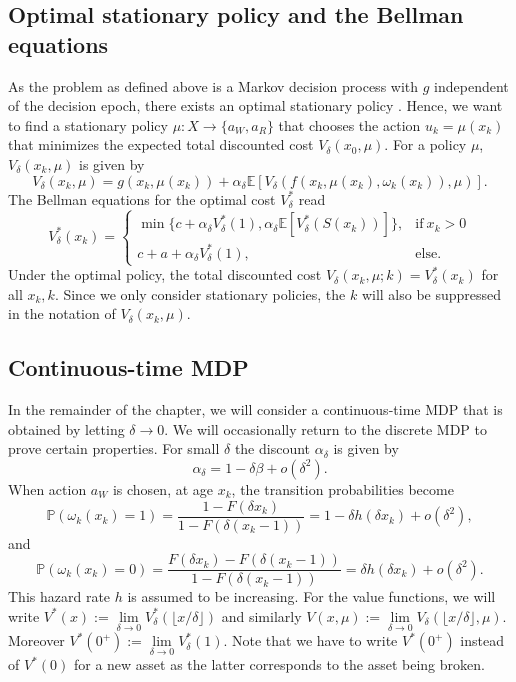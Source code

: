 \documentclass[a4paper]{thesis}
\theoremstyle{definition}
\begin{document}
\subsection{Optimal stationary policy and the Bellman equations}
As the problem as defined above is a Markov decision process with $g$ independent of the decision epoch, there exists an optimal stationary policy \cite{Puterman2008}.
Hence, we want to find a stationary policy $\mu:X\rightarrow \{a_W,a_R\}$ that chooses the action $u_k=\mu(x_k)$ that minimizes the expected total discounted cost $V_\delta(x_0,\mu)$.
For a policy $\mu$, $V_\delta(x_k,\mu)$ is given by
$$
V_\delta(x_k,\mu)=g(x_k,\mu(x_k))+\alpha_\delta \mathbb{E}[V_\delta(f(x_k,\mu(x_k),\omega_k(x_k)),\mu)].
$$
The Bellman equations for the optimal cost $V^*_\delta$ read
\begin{equation}\label{eq:AgeBasedBellman}
V^*_\delta(x_k)=\begin{cases}
\min\{c+\alpha_\delta V^*_\delta(1),\alpha_\delta \mathbb{E}[V^*_\delta(S(x_k))]\},&\text{if}\ x_k>0 \\
c+a+\alpha_\delta V^*_\delta(1),&\text{else.}
\end{cases}
\end{equation}
Under the optimal policy, the total discounted cost $V_\delta(x_k,\mu;k)=V^*_\delta(x_k)$ for all $x_k,k$.
Since we only consider stationary policies, the $k$ will also be suppressed in the notation of $V_\delta(x_k,\mu)$.

\subsection{Continuous-time MDP}
In the remainder of the chapter, we will consider a continuous-time MDP that is obtained by letting $\delta\rightarrow0$.
We will occasionally return to the discrete MDP to prove certain properties.
For small $\delta$ the discount $\alpha_\delta$ is given by
\[
\alpha_\delta=1-\delta\beta+o(\delta^2).
\]
When action $a_W$ is chosen, at age $x_k$, the transition probabilities become
$$
\mathbb{P}(\omega_k(x_k)=1)=\frac{1-F(\delta x_k)}{1-F(\delta (x_k-1))}=1-\delta h(\delta x_k)+o(\delta^2),
$$
and
\[
\mathbb{P}(\omega_k(x_k)=0)=\frac{F(\delta x_k)-F(\delta (x_k-1))}{1-F(\delta (x_k-1))}=\delta h(\delta x_k)+o(\delta^2).
\]
This hazard rate $h$ is assumed to be increasing.
For the value functions, we will write $V^*(x):=\lim\limits_{\delta\rightarrow0}V_\delta^*(\lfloor x/\delta\rfloor)$ and similarly $V(x,\mu):=\lim\limits_{\delta\rightarrow0}V_\delta(\lfloor x/\delta\rfloor,\mu)$.
Moreover $V^*(0^+):=\lim\limits_{\delta\rightarrow0}V_\delta^*(1)$.
Note that we have to write $V^*(0^+)$ instead of $V^*(0)$ for a new asset as the latter corresponds to the asset being broken.
\end{document}
